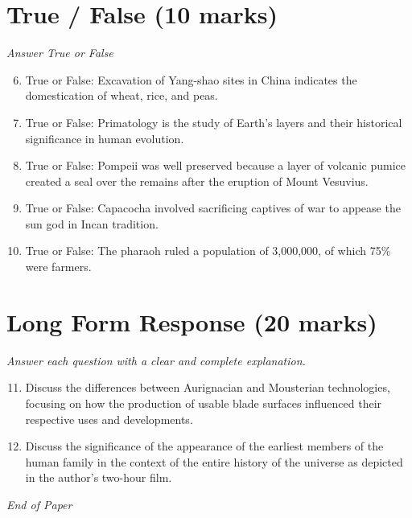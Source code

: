 \documentclass[12pt]{article}
\begin{document}
\section*{True / False (10 marks)}
\textit{Answer True or False}
\begin{enumerate}[label=\arabic*.]
\setcounter{enumi}{5}
\item True or False: Excavation of Yang-shao sites in China indicates the domestication of wheat, rice, and peas.
\item True or False: Primatology is the study of Earth's layers and their historical significance in human evolution.
\item True or False: Pompeii was well preserved because a layer of volcanic pumice created a seal over the remains after the eruption of Mount Vesuvius.
\item True or False: Capacocha involved sacrificing captives of war to appease the sun god in Incan tradition.
\item True or False: The pharaoh ruled a population of 3,000,000, of which 75\% were farmers.
\end{enumerate}

\section*{Long Form Response (20 marks)}
\textit{Answer each question with a clear and complete explanation.}
\begin{enumerate}[label=\arabic*.]
\setcounter{enumi}{10}
\item Discuss the differences between Aurignacian and Mousterian technologies, focusing on how the production of usable blade surfaces influenced their respective uses and developments.
\item Discuss the significance of the appearance of the earliest members of the human family in the context of the entire history of the universe as depicted in the author's two-hour film.
\end{enumerate}

\vfill
\noindent\textit{End of Paper}
\end{document}
